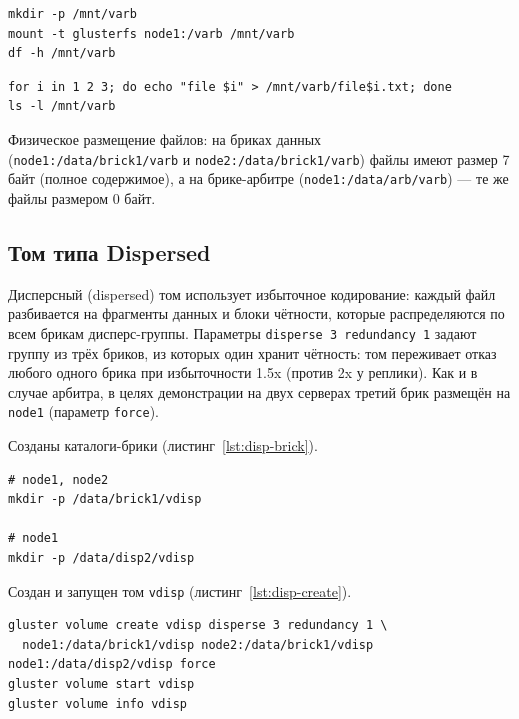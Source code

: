 \begin{lstlisting}[caption={Монтирование тома на клиенте (mgmt)}, label={lst:arb-mount}]
mkdir -p /mnt/varb
mount -t glusterfs node1:/varb /mnt/varb
df -h /mnt/varb
\end{lstlisting}

\begin{lstlisting}[caption={Запись тестовых файлов (mgmt)}, label={lst:arb-write}]
for i in 1 2 3; do echo "file $i" > /mnt/varb/file$i.txt; done
ls -l /mnt/varb
\end{lstlisting}

Физическое размещение файлов: на бриках данных\\
(\texttt{node1:/data/brick1/varb} и \texttt{node2:/data/brick1/varb})
файлы имеют размер 7 байт (полное содержимое), а на брике-арбитре
(\texttt{node1:/data/arb/varb}) --- те же файлы размером 0 байт.

\subsection{Том типа Dispersed}

Дисперсный (dispersed) том использует избыточное кодирование: 
каждый файл разбивается на фрагменты данных и
блоки чётности, которые распределяются по всем брикам
дисперс-группы. Параметры \texttt{disperse 3 redundancy 1} задают
группу из трёх бриков, из которых один хранит чётность: том
переживает отказ любого одного брика при избыточности 1.5x
(против 2x у реплики). Как и в случае арбитра, в целях
демонстрации на двух серверах третий брик размещён на
\texttt{node1} (параметр \texttt{force}).

Созданы каталоги-брики (листинг~\ref{lst:disp-brick}).

\begin{lstlisting}[caption={Создание бриков (node1, node2)}, label={lst:disp-brick}]
# node1, node2
mkdir -p /data/brick1/vdisp

# node1
mkdir -p /data/disp2/vdisp
\end{lstlisting}

Создан и запущен том \texttt{vdisp} (листинг~\ref{lst:disp-create}).

\begin{lstlisting}[caption={Создание и запуск тома vdisp (node1)}, label={lst:disp-create}]
gluster volume create vdisp disperse 3 redundancy 1 \
  node1:/data/brick1/vdisp node2:/data/brick1/vdisp node1:/data/disp2/vdisp force
gluster volume start vdisp
gluster volume info vdisp
\end{lstlisting}


